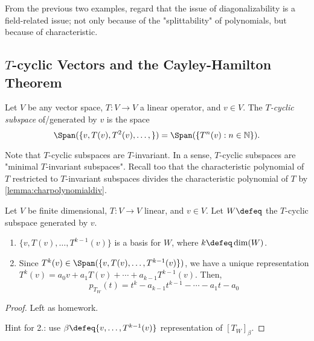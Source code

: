 \begin{remark}
    From the previous two examples, regard that the issue of diagonalizability is a field-related issue; not only because of the "splittability" of polynomials, but because of characteristic.
\end{remark}

\subsection{\texorpdfstring{$T$}{T}-cyclic Vectors and the Cayley-Hamilton Theorem}

\begin{definition}
    Let $V$ be any vector space, $T : V \to V$ a linear operator, and $v \in V$. The \emph{$T$-cyclic subspace} of/generated by $v$ is the space $$\Span(\{v, T(v), T^2(v), \dots,\}) = \Span(\{T^n(v) : n \in \mathbb{N}\}).$$
\end{definition}

\begin{remark}
    Note that $T$-cyclic subspaces are $T$-invariant. In a sense, $T$-cyclic subspaces are "minimal $T$-invariant subspaces". Recall too that the characteristic polynomial of $T$ restricted to $T$-invariant subspaces divides the characteristic polynomial of $T$ by \cref{lemma:charpolynomialdiv}.
\end{remark}

\begin{lemma}\label{lemma:forcayley}
    Let $V$ be finite dimensional, $T : V \to V$ linear, and $v \in V$. Let $W \defeq $ the $T$-cyclic subspace generated by $v$.
    \begin{enumerate}
        \item $\{v, T(v), \dots, T^{k-1}(v)\}$ is a basis for $W$, where $k \defeq \dim(W)$.
        \item Since $T^{k}(v) \in \Span(\{v, T(v), \dots, T^{k-1}(v)\})$, we have a unique representation $T^k(v) = a_0 v + a_1T(v) + \cdots  + a_{k-1}T^{k-1}(v)$. Then, \[
        p_{T_W}(t) = t^k - a_{k-1}t^{k-1} - \cdots - a_1 t - a_0    
        \]
    \end{enumerate}
\end{lemma}

\begin{proof}
    Left as homework.

    Hint for 2.: use $\beta \defeq \{v, \dots, T^{k-1}(v)\}$ representation of $[T_W]_\beta$.
\end{proof}

